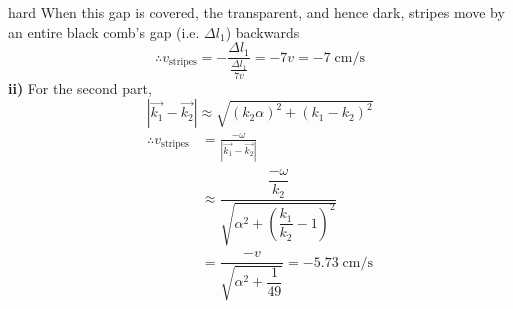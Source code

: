 \begin{solution}{hard}
When this gap is covered, the transparent, and hence dark, stripes move by an entire black comb's gap (i.e. $\Delta l_1$) backwards
$$\therefore v_{\text{stripes}}=-\frac{\Delta l_1}{\frac{\Delta l_1}{7v}}=-7v=\boxed{-7 \;\text{cm/s}}$$
\tcbline 
\textbf{ii)} For the second part,
$$\left | \vec{k_1}-\vec{k_2} \right | \approx  \sqrt{(k_2 \alpha)^2 + (k_1-k_2)^2}$$
\begin{align*}
\therefore v_{\text{stripes}}&=\frac{-\omega}{\left | \vec{k_1}-\vec{k_2} \right |} \\
&\approx \dfrac{\dfrac{-\omega }{k_2}}{\sqrt{ \alpha ^2 + \left (\dfrac{k_1}{k_2}-1  \right )^2}}\\
&=\dfrac{-v}{\sqrt{\alpha^2+\dfrac{1}{49}}} = \boxed{-5.73 \;\text{cm/s}}
\end{align*}
\end{solution}